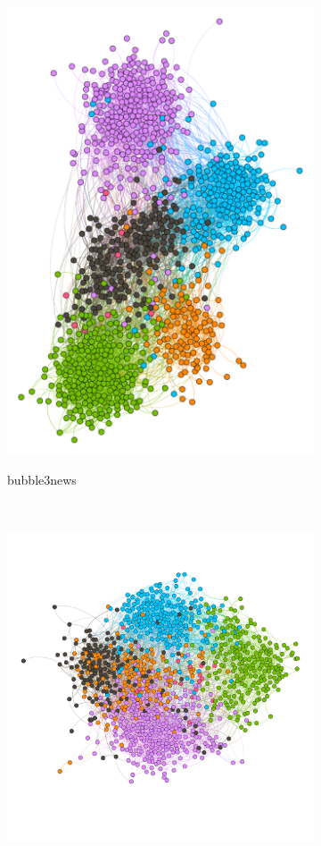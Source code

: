 \begin{figure}
\begin{subfigure}[t]{0.35\textwidth}
    \includegraphics[width=\textwidth]{img/dim5_mod.pdf}
    \label{fig:bubble5mod}
    \caption{bubble3news}
  \end{subfigure}
  ~
  \begin{subfigure}[t]{0.35\textwidth}
    \includegraphics[width=\textwidth]{img/dim7_mod.pdf}

\end{subfigure}
\end{figure}
